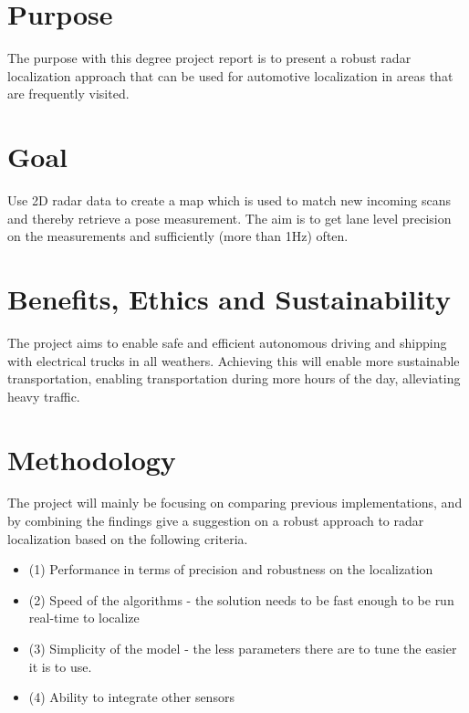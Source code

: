 \section{Purpose}
The purpose with this degree project report is to present a robust radar localization approach that can be used for automotive localization in areas that are frequently visited. 

\section{Goal}
Use 2D radar data to create a map which is used to match new incoming scans and thereby retrieve a pose measurement. The aim is to get lane level precision on the measurements and sufficiently (more than 1Hz) often.
\section{Benefits, Ethics and Sustainability}
The project aims to enable safe and efficient autonomous driving and shipping with electrical trucks in all weathers. Achieving this will enable more sustainable transportation, enabling transportation during more hours of the day, alleviating heavy traffic.
\section{Methodology}
The project will mainly be focusing on comparing previous implementations, and by combining the findings give a suggestion on a robust approach to radar localization based on the following criteria. 
\begin{itemize}
    \item (1) Performance in terms of precision and robustness on the localization
    \item (2) Speed of the algorithms - the solution needs to be fast enough to be run  real-time to localize 
    \item (3) Simplicity of the model - the less parameters there are to tune the easier it is to use. 
    \item (4) Ability to integrate other sensors
\end{itemize}


